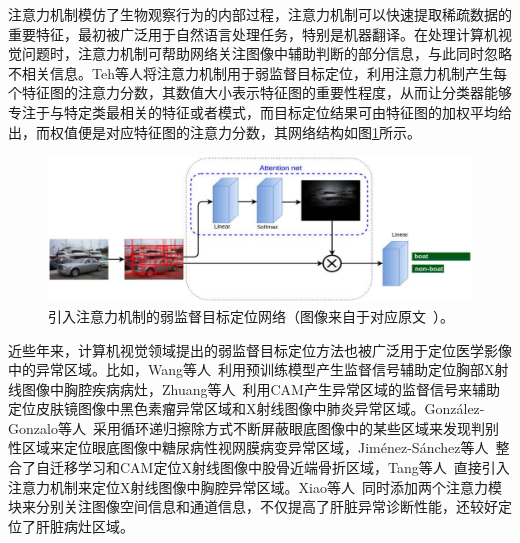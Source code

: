 注意力机制模仿了生物观察行为的内部过程，注意力机制可以快速提取稀疏数据的重要特征，最初被广泛用于自然语言处理任务，特别是机器翻译。在处理计算机视觉问题时，注意力机制可帮助网络关注图像中辅助判断的部分信息，与此同时忽略不相关信息。Teh等人\cite{BMVC2016_52}将注意力机制用于弱监督目标定位，利用注意力机制产生每个特征图的注意力分数，其数值大小表示特征图的重要性程度，从而让分类器能够专注于与特定类最相关的特征或者模式，而目标定位结果可由特征图的加权平均给出，而权值便是对应特征图的注意力分数，其网络结构如图\ref{fig:attention_weakly_supervised_object_localization}所示。
\begin{figure}[h]
	\centering
	\includegraphics[width=1.0\textwidth]{figure/attention_weakly_supervised_object_localization}
	\caption[引入注意力机制的弱监督目标定位网络]{引入注意力机制的弱监督目标定位网络（图像来自于对应原文~\cite{BMVC2016_52}）。}
	\label{fig:attention_weakly_supervised_object_localization}
\end{figure}

近些年来，计算机视觉领域提出的弱监督目标定位方法也被广泛用于定位医学影像中的异常区域。比如，Wang等人~\cite{WangPLLBS17}利用预训练模型产生监督信号辅助定位胸部X射线图像中胸腔疾病病灶，Zhuang等人~\cite{zhuang2019care}利用CAM产生异常区域的监督信号来辅助定位皮肤镜图像中黑色素瘤异常区域和X射线图像中肺炎异常区域。Gonz{\'a}lez-Gonzalo等人~\cite{GonzlezGonzalo2018ImprovingWL}采用循环递归擦除方式不断屏蔽眼底图像中的某些区域来发现判别性区域来定位眼底图像中糖尿病性视网膜病变异常区域，Jim{\'e}nez-S{\'a}nchez等人~\cite{JimnezSnchez2018WeaklySupervisedLA}整合了自迁移学习和CAM定位X射线图像中股骨近端骨折区域，Tang等人~\cite{Tang2018AttentionGuidedCL}直接引入注意力机制来定位X射线图像中胸腔异常区域。Xiao等人~\cite{chen2019cascade}同时添加两个注意力模块来分别关注图像空间信息和通道信息，不仅提高了肝脏异常诊断性能，还较好定位了肝脏病灶区域。

